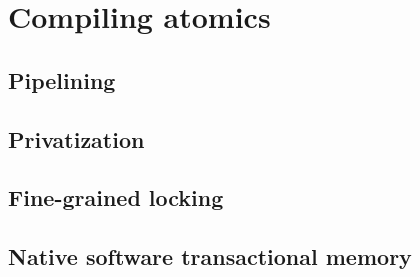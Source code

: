\section{Compiling atomics}

\subsection{Pipelining}

\subsection{Privatization}

\subsection{Fine-grained locking}

\subsection{Native software transactional memory}
